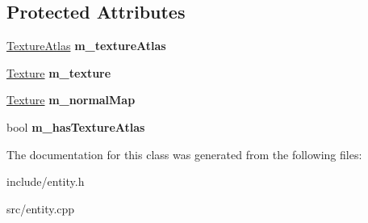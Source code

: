 \subsection*{Protected Attributes}
\begin{DoxyCompactItemize}
\item 
\hypertarget{class_z_e_g_l_1_1_render_entity_a52be90c41c3efc4da8ac08850e86590e}{}\hyperlink{class_z_e_g_l_1_1_texture_atlas}{Texture\+Atlas} {\bfseries m\+\_\+texture\+Atlas}\label{class_z_e_g_l_1_1_render_entity_a52be90c41c3efc4da8ac08850e86590e}

\item 
\hypertarget{class_z_e_g_l_1_1_render_entity_aa6b8685142c9f25a497968613c992ce9}{}\hyperlink{class_z_e_g_l_1_1_texture}{Texture} {\bfseries m\+\_\+texture}\label{class_z_e_g_l_1_1_render_entity_aa6b8685142c9f25a497968613c992ce9}

\item 
\hypertarget{class_z_e_g_l_1_1_render_entity_aa3e87b641a10302e2f17cf18069c8c63}{}\hyperlink{class_z_e_g_l_1_1_texture}{Texture} {\bfseries m\+\_\+normal\+Map}\label{class_z_e_g_l_1_1_render_entity_aa3e87b641a10302e2f17cf18069c8c63}

\item 
\hypertarget{class_z_e_g_l_1_1_render_entity_ab8efc85bf2a85f8762ea51c0f749238f}{}bool {\bfseries m\+\_\+has\+Texture\+Atlas}\label{class_z_e_g_l_1_1_render_entity_ab8efc85bf2a85f8762ea51c0f749238f}

\end{DoxyCompactItemize}


The documentation for this class was generated from the following files\+:\begin{DoxyCompactItemize}
\item 
include/entity.\+h\item 
src/entity.\+cpp\end{DoxyCompactItemize}
